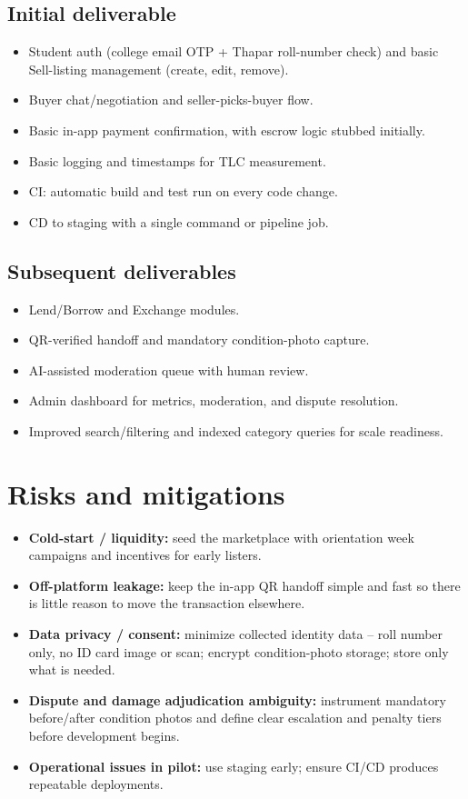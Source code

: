 \documentclass[11pt]{article}
\begin{document}
\subsection{Initial deliverable}
\begin{itemize}[leftmargin=*]
\item Student auth (college email OTP + Thapar roll-number check) and basic Sell-listing management (create, edit, remove).
\item Buyer chat/negotiation and seller-picks-buyer flow.
\item Basic in-app payment confirmation, with escrow logic stubbed initially.
\item Basic logging and timestamps for TLC measurement.
\item CI: automatic build and test run on every code change.
\item CD to staging with a single command or pipeline job.
\end{itemize}

\subsection{Subsequent deliverables}
\begin{itemize}[leftmargin=*]
\item Lend/Borrow and Exchange modules.
\item QR-verified handoff and mandatory condition-photo capture.
\item AI-assisted moderation queue with human review.
\item Admin dashboard for metrics, moderation, and dispute resolution.
\item Improved search/filtering and indexed category queries for scale readiness.
\end{itemize}

\section{Risks and mitigations}
\begin{itemize}[leftmargin=*]
\item \textbf{Cold-start / liquidity:} seed the marketplace with orientation week campaigns and incentives for early listers.
\item \textbf{Off-platform leakage:} keep the in-app QR handoff simple and fast so there is little reason to move the transaction elsewhere.
\item \textbf{Data privacy / consent:} minimize collected identity data -- roll number only, no ID card image or scan; encrypt condition-photo storage; store only what is needed.
\item \textbf{Dispute and damage adjudication ambiguity:} instrument mandatory before/after condition photos and define clear escalation and penalty tiers before development begins.
\item \textbf{Operational issues in pilot:} use staging early; ensure CI/CD produces repeatable deployments.
\end{itemize}
\end{document}
